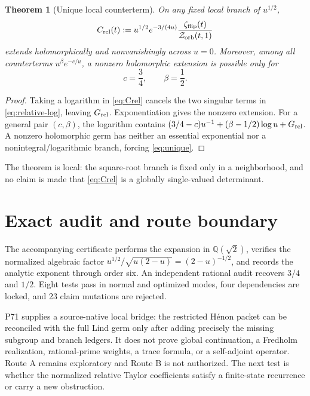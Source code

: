 \documentclass[11pt]{article}
\newtheorem{theorem}{Theorem}[section]
\newcommand{\Zorb}{\mathcal Z_{\rm orb}}
\newcommand{\zflip}{\zeta_{\rm flip}}
\begin{document}
\begin{theorem}[Unique local counterterm]\label{thm:counterterm}
On any fixed local branch of $u^{1/2}$,
\begin{equation}\label{eq:Crel}
 C_{\rm rel}(t):=
 u^{1/2}e^{-3/(4u)}
 \frac{\zflip(t)}{\Zorb(t,1)}
\end{equation}
extends holomorphically and nonvanishingly across $u=0$.
Moreover, among all counterterms $u^\beta e^{-c/u}$, a nonzero holomorphic
extension is possible only for
\begin{equation}\label{eq:unique}
 c=\frac34,\qquad\beta=\frac12.
\end{equation}
\end{theorem}

\begin{proof}
Taking a logarithm in \eqref{eq:Crel} cancels the two singular terms in
\eqref{eq:relative-log}, leaving $G_{\rm rel}$.  Exponentiation gives the
nonzero extension.  For a general pair $(c,\beta)$, the logarithm contains
$(3/4-c)u^{-1}+(\beta-1/2)\log u+G_{\rm rel}$.  A nonzero holomorphic germ
has neither an essential exponential nor a nonintegral/logarithmic branch,
forcing \eqref{eq:unique}.
\end{proof}

The theorem is local: the square-root branch is fixed only in a neighborhood,
and no claim is made that \eqref{eq:Crel} is a globally single-valued
determinant.

\section{Exact audit and route boundary}

The accompanying certificate performs the expansion in
$\mathbb Q(\sqrt2)$, verifies the normalized algebraic factor
$u^{1/2}/\sqrt{u(2-u)}=(2-u)^{-1/2}$, and records the analytic exponent
through order six.  An independent rational audit recovers $3/4$ and
$1/2$.  Eight tests pass in normal and optimized modes, four dependencies
are locked, and 23 claim mutations are rejected.

P71 supplies a source-native local bridge: the restricted H\'enon packet can
be reconciled with the full Lind germ only after adding precisely the missing
subgroup and branch ledgers.  It does not prove global continuation, a
Fredholm realization, rational-prime weights, a trace formula, or a
self-adjoint operator.  Route A remains exploratory and Route B is not
authorized.  The next test is whether the normalized relative Taylor
coefficients satisfy a finite-state recurrence or carry a new obstruction.



\end{document}
